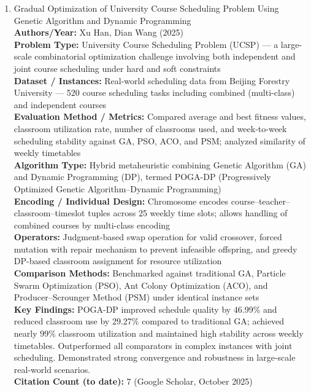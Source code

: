 \documentclass[a4paper,12pt]{article}
\begin{document}
\begin{enumerate}[leftmargin=2em, labelwidth=1em, labelsep=0.5em, itemsep=1ex]
  \item Gradual Optimization of University Course Scheduling Problem Using Genetic Algorithm and Dynamic Programming \\
    \textbf{Authors/Year:} Xu Han, Dian Wang (2025) \\  
    \textbf{Problem Type:} University Course Scheduling Problem (UCSP) — a large-scale combinatorial optimization challenge involving both independent and joint course scheduling under hard and soft constraints \\  
    \textbf{Dataset / Instances:} Real-world scheduling data from Beijing Forestry University — 520 course scheduling tasks including combined (multi-class) and independent courses \\  
    \textbf{Evaluation Method / Metrics:} Compared average and best fitness values, classroom utilization rate, number of classrooms used, and week-to-week scheduling stability against GA, PSO, ACO, and PSM; analyzed similarity of weekly timetables \\  
    \textbf{Algorithm Type:} Hybrid metaheuristic combining Genetic Algorithm (GA) and Dynamic Programming (DP), termed POGA-DP (Progressively Optimized Genetic Algorithm–Dynamic Programming) \\  
    \textbf{Encoding / Individual Design:} Chromosome encodes course–teacher–classroom–timeslot tuples across 25 weekly time slots; allows handling of combined courses by multi-class encoding \\  
    \textbf{Operators:} Judgment-based swap operation for valid crossover, forced mutation with repair mechanism to prevent infeasible offspring, and greedy DP-based classroom assignment for resource utilization \\  
    \textbf{Comparison Methods:} Benchmarked against traditional GA, Particle Swarm Optimization (PSO), Ant Colony Optimization (ACO), and Producer–Scrounger Method (PSM) under identical instance sets \\  
    \textbf{Key Findings:} POGA-DP improved schedule quality by 46.99\% and reduced classroom use by 29.27\% compared to traditional GA; achieved nearly 99\% classroom utilization and maintained high stability across weekly timetables. Outperformed all comparators in complex instances with joint scheduling. Demonstrated strong convergence and robustness in large-scale real-world scenarios. \\  
    \textbf{Citation Count (to date):} 7 (Google Scholar, October 2025) \\[2ex]
  

\end{enumerate}
\end{document}
